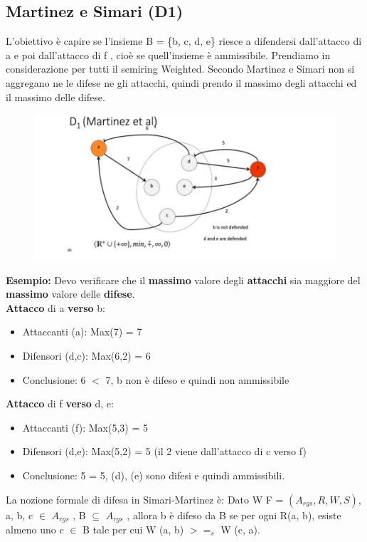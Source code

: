 \subsection{Martinez e Simari (D1)}
L’obiettivo è capire se l’insieme B = \{b, c, d, e\} riesce a difendersi dall’attacco di a e poi dall’attacco di f , cioè se quell'insieme è ammissibile. Prendiamo in considerazione per tutti il semiring Weighted. Secondo Martinez e Simari non si aggregano ne le difese ne gli attacchi, quindi prendo il massimo degli attacchi ed il massimo delle difese.
\begin{figure}[htp]
	\centering
    \includegraphics[width=12cm, keepaspectratio]{img/Cap6/martinez.png}
\end{figure}
\newpage
\textbf{Esempio:} Devo verificare che il \textbf{massimo} valore degli \textbf{attacchi} sia maggiore del \textbf{massimo} valore delle \textbf{difese}.
\\\textbf{Attacco} di a \textbf{verso} b:
\begin{itemize}
    \item Attaccanti (a): Max(7) = 7
    \item Difensori (d,c): Max(6,2) = 6
    \item Conclusione: 6 $<$ 7, b non è difeso e quindi non ammissibile
\end{itemize}
\textbf{Attacco} di f \textbf{verso} d, e:
\begin{itemize}
    \item  Attaccanti (f): Max(5,3) = 5
    \item Difensori (d,e): Max(5,2) = 5 (il 2 viene dall’attacco di c verso f)
    \item Conclusione: 5 = 5, (d), (e) sono difesi e quindi ammissibili.
\end{itemize}
La nozione formale di difesa in Simari-Martinez è: Dato W F = $(A_{rgs} , R, W, S)$, a, b, c $\in$ $A_{rgs}$ , B $\subseteq$ $A_{rgs}$ , allora b è difeso da B se per ogni R(a, b), esiste almeno uno c $\in$ B tale per cui W (a, b) $>=_s$ W (c, a).
\newpage
